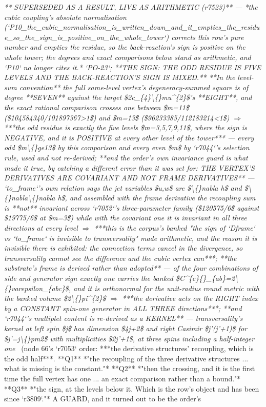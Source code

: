 \begin{description}
\textit{** SUPERSEDED AS A RESULT, LIVE AS ARITHMETIC (r7523)** --- *the cubic coupling's absolute normalisation (`P10\_the\_cubic\_normalisation\_is\_written\_down\_and\_it\_empties\_the\_residue\_so\_the\_sign\_is\_positive\_on\_the\_whole\_tower`) corrects this row's pure number and empties the residue, so the back-reaction's sign is positive on the whole tower; the degrees and exact comparisons below stand as arithmetic, and `P10` no longer cites it.* `PO-23`;  **THE SIGN: THE ODD RESIDUE IS FIVE LEVELS AND THE BACK-REACTION'S SIGN IS MIXED.** **In the level-sum convention** the full same-level vertex's degeneracy-summed square is of degree **SEVEN** against the target \$2c\_\{4\}\textbackslash\{\}mu\textasciicircum{}\{2\}\$'s **EIGHT**, and the exact rational comparison crosses one between \$m=11\$ (\$104584340/101897367>1\$) and \$m=13\$ (\$96233385/112183214<1\$) \ensuremath{\Rightarrow} ***the odd residue is exactly the five levels \$m=3,5,7,9,11\$, where the sign is NEGATIVE, and it is POSITIVE at every other level of the tower*** --- every odd \$m\textbackslash\{\}ge13\$ by this comparison and every even \$m\$ by `r7044`'s selection rule, used and not re-derived;  **and the order's own invariance guard is what made it true, by catching a different error than it was set for: THE VERTEX'S DERIVATIVES ARE COVARIANT AND NOT FRAME DERIVATIVES** --- `to\_frame`'s own relation says the jet variables \$u,w\$ are \$\textbackslash\{\}nabla h\$ and \$\textbackslash\{\}nabla\textbackslash\{\}nabla h\$, and assembled with the frame derivative the recoupling sum is **not** invariant across `r7052`'s three-parameter family (\$120575/6\$ against \$19775/6\$ at \$m=3\$) while with the covariant one it is invariant in all three directions at every level \ensuremath{\Rightarrow} ***this is the corpus's banked "the sign of `Dframe` vs `to\_frame` is invisible to transversality" made arithmetic, and the reason it is invisible there is exhibited: the connection terms cancel in the divergence, so transversality cannot see the difference and the cubic vertex can***;  **the substrate's frame is derived rather than adopted** --- of the four combinations of side and generator sign exactly one carries the banked \$C\textasciicircum{}\{c\}\{\}\_\{ab\}=2\textbackslash\{\}varepsilon\_\{abc\}\$, and it is orthonormal for the unit-radius round metric with the banked volume \$2\textbackslash\{\}pi\textasciicircum{}\{2\}\$ \ensuremath{\Rightarrow} ***the derivative acts on the RIGHT index by a CONSTANT spin-one generator in ALL THREE directions***;  **and `r7044`'s multiplet content is re-derived as a KERNEL** --- transversality's kernel at left spin \$j\$ has dimension \$4j+2\$ and right Casimir \$j'(j'+1)\$ for \$j'=j\textbackslash\{\}pm2\$ with multiplicities \$2j'+1\$, at three spins including a half-integer one} \ (node 66's `r7053` order: ***the derivative structures' recoupling, which is the odd half***. **Q1** *"the recoupling of the three derivative structures ... what is missing is the constant."* **Q2** *"then the crossing, and it is the first time the full vertex has one ... an exact comparison rather than a bound."* **Q3** *"the sign, at the levels below it. Which is the row's object and has been since `r3809`."*  A GUARD, and it turned out to be the order's 
\end{description}
